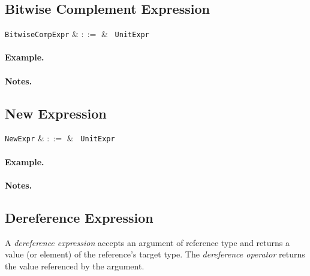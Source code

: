 \subsection{Bitwise Complement Expression}
\label{c_expr_bitwise_complement}

\begin{syntax}
\verb+BitwiseCompExpr+ & $::=$ & \token{~}\ \verb+UnitExpr+\\
\end{syntax}

\paragraph{Example.}

\paragraph{Notes.}


\subsection{New Expression}
\label{c_expr_new}

\begin{syntax}
\verb+NewExpr+ & $::=$ & \ \verb+UnitExpr+\\
\end{syntax}

\paragraph{Example.}

\paragraph{Notes.}


\subsection{Dereference Expression}
\label{c_expr_dereference}

A {\em dereference expression} accepts an argument of reference type and returns a value (or element) of the reference's target type.  The {\em dereference operator} returns the value referenced by the argument.  

